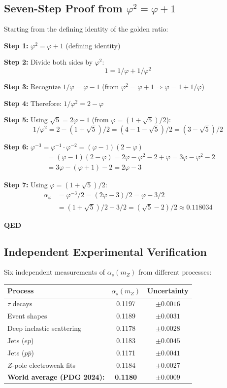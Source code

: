 \documentclass{article}
\begin{document}
\subsection{Seven-Step Proof from $\varphi^2 = \varphi + 1$}

Starting from the defining identity of the golden ratio:

\textbf{Step 1:} $\varphi^2 = \varphi + 1$  (defining identity)

\textbf{Step 2:} Divide both sides by $\varphi^2$:
\[
1 = 1/\varphi + 1/\varphi^2
\]

\textbf{Step 3:} Recognize $1/\varphi = \varphi - 1$ (from $\varphi^2 = \varphi + 1 \Rightarrow \varphi = 1 + 1/\varphi$)

\textbf{Step 4:} Therefore: $1/\varphi^2 = 2 - \varphi$

\textbf{Step 5:} Using $\sqrt{5} = 2\varphi - 1$ (from $\varphi = (1+\sqrt{5})/2$):
\[
1/\varphi^2 = 2 - (1+\sqrt{5})/2 = (4 - 1 - \sqrt{5})/2 = (3 - \sqrt{5})/2
\]

\textbf{Step 6:} $\varphi^{-3} = \varphi^{-1} \cdot \varphi^{-2} = (\varphi - 1)(2 - \varphi)$
\begin{align*}
&= (\varphi - 1)(2 - \varphi) = 2\varphi - \varphi^2 - 2 + \varphi = 3\varphi - \varphi^2 - 2 \\
&= 3\varphi - (\varphi + 1) - 2 = 2\varphi - 3
\end{align*}

\textbf{Step 7:} Using $\varphi = (1+\sqrt{5})/2$:
\begin{align*}
\alpha_\varphi &= \varphi^{-3}/2 = (2\varphi - 3)/2 = \varphi - 3/2 \\
&= (1+\sqrt{5})/2 - 3/2 = (\sqrt{5} - 2)/2 \approx 0.118034
\end{align*}

\textbf{QED}

\subsection{Independent Experimental Verification}

Six independent measurements of $\alpha_s(m_Z)$ from different processes:

\begin{table}[h]
\centering
\begin{tabular}{lcc}
\toprule
Process & $\alpha_s(m_Z)$ & Uncertainty \\
\midrule
$\tau$ decays & 0.1197 & $\pm 0.0016$ \\
Event shapes & 0.1189 & $\pm 0.0031$ \\
Deep inelastic scattering & 0.1178 & $\pm 0.0028$ \\
Jets ($ep$) & 0.1183 & $\pm 0.0045$ \\
Jets ($p\bar{p}$) & 0.1171 & $\pm 0.0041$ \\
$Z$-pole electroweak fits & 0.1184 & $\pm 0.0027$ \\
\midrule
\textbf{World average (PDG 2024):} & \textbf{0.1180} & $\pm \mathbf{0.0009}$ \\
\bottomrule
\end{tabular}
\end{table}
\end{document}

